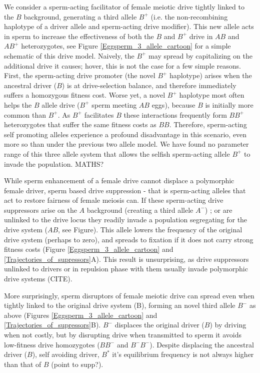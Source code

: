 \documentclass[12pt,letterpaper]{article}
\newcommand{\yb}[1]{{ \color{blue} #1}}
\begin{document}
We consider a sperm-acting facilitator of
	female meiotic drive tightly linked to the $B$ background, 
	generating a third allele $B^{+}$ (i.e. the non-recombining haplotype of a
        driver allele and sperm-acting drive modifier). 
This new allele acts in sperm to increase the effectiveness of both
	the $B$ and  $B^{+}$ drive in $AB$ and $AB^{+}$ heterozygotes, see Figure \ref{Eggsperm_3_allele_cartoon} 
	for a simple schematic of this drive model.  
Naively, the $B^{+}$ may spread by capitalizing on the additional drive it causes; hover,  
	this is not the case for a few simple reasons. 
First, the sperm-acting drive promoter (the novel $B^{+}$ haplotype) 
	arises when the ancestral driver ($B$) is at drive-selection balance, 
	and therefore immediately suffers a homozygous fitness cost.  
Worse yet, a novel $B^{+}$ haplotype most often helps 
	the $B$  allele drive ($B^+$ sperm meeting $AB$ eggs), because $B$ is initially more common than $B^{+}$. 
As $B^{+}$ facilitates $B$ these interactions frequently form 
	$BB^{+}$ heterozygotes that suffer the same fitness costs as $BB$. 
Therefore, sperm-acting self promoting alleles experience a profound disadvantage
	in this scenario, even more so than under the previous two allele model. 
We have found no parameter range of this
	three allele system that allows the selfish sperm-acting allele $B^{+}$ to
	invade the population. \yb{MATHS?}

While  sperm enhancement of a female drive cannot displace a polymorphic female driver, sperm based drive suppression - 
	that is sperm-acting alleles that act to restore 
	fairness of female meiosis can. 
If these sperm-acting drive suppressors arise on
	the $A$ background (creating a third allele $A^{-}$) ;
	or are unlinked to the drive locus they readily invade a population segregating
	for the drive system ($AB$, see Figure). 
This allele lowers the frequency of the original drive system (perhaps to zero),
	and spreads to fixation if it does not carry strong fitness costs
	(Figure \ref{Eggsperm_3_allele_cartoon} and \ref{Trajectories_of_supressors}A). 
\yb{This result is unsurprising, as drive suppressors unlinked to drivers or in repulsion phase with them usually invade polymorphic drive systems (CITE).}  

More surprisingly, sperm disruptors of female meiotic drive can spread
	even when tightly linked to the original drive system (B), forming
	an novel third allele $B^{-}$ as above 
	(Figures \ref{Eggsperm_3_allele_cartoon} and \ref{Trajectories_of_supressors}B). 
$B^{-}$ displaces the original driver ($B$) by driving when not costly, 
	but by disrupting drive when transmitted to sperm it avoids low-fitness drive homozygotes ($BB^-$ and $B^-B^-$). 
Despite displacing the ancestral driver ($B$), self avoiding driver, $B^*$ it's equilibrium frequency is not always higher than that of $B$ \yb{(point to supp?)}. 
\end{document}
